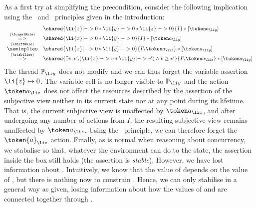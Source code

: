 As a first try at simplifying the precondition, consider the following implication using the \forgetRule\
and \shiftRule\ principles given in the introduction:
%
\[
\begin{array}{c l}
 & \shared{\li{x}|-> 0 * \li{y}|->0 * \li{z}|-> 0}{I} *[\token a_{\li y}]\\
\stackrel{(\forgetRule)}{=>}  &\shared{\li{x}|-> 0 * \li{y}|->0}{I} *[\token a_{\li y} ]\\
 \stackrel{(\shiftRule)}{\semimplies}  &\shared{\li{x}|-> 0 * \li{y}|->0 }{I\backslash\token a_{\li z}} *[\token a_{\li y}]\\
\stackrel{(\stabilise)}{=>}  &\shared{\exists v, v'.  (\li{x}|-> v * \li{y}|->v' ) \wedge v\geq v'}{I\backslash \token a_{\li z}} *[\token a_{\li y}]\\
\end{array}
\]
The thread $\mathbb{P}_{\li y}$ does not modify  and we can thus
forget the variable assertion $ \mapsto 0$. The variable cell \li{z} is no longer visible to $\mathbb{P}_{\li y}$ and the
action $\token a_{\li z}$ does not affect the resources described by the
assertion of the subjective view neither in its current state nor at any point during its lifetime. That is, the current subjective view is unaffected by $\token a_{\li z}$, and after undergoing any number of actions
from $I$, the resulting subjective view remains unaffected by $\token
a_{\li z}$. Using the \shiftRule\  principle, we
can therefore forget the $\token{a}_{\li z}$ action. 
Finally, as is normal when reasoning about concurrency, we stabalise  so
that, whatever the environment can do to the state, the assertion
inside the box still holds (the assertion is \emph{stable}). However, we have   lost information about
. Intuitively, we know that the value of \li{y} depends on the value
of , but there is nothing now to constrain \li{z}. Hence, we can only
stabilise in a general way as given, losing information about how the
values of \li{x} and \li{y} are connected together through \li{z}.

